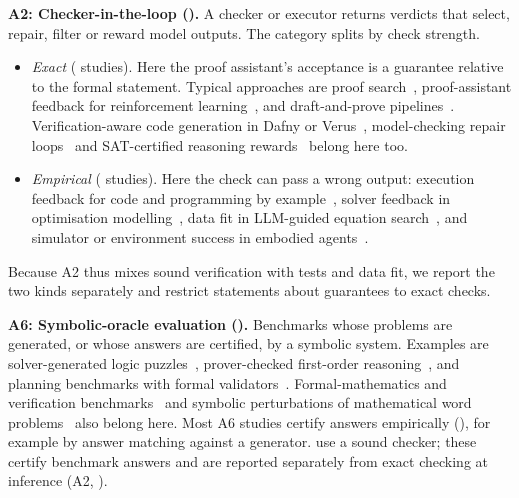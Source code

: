 \textbf{A2: Checker-in-the-loop ().} A checker or executor returns verdicts that select, repair, filter or reward model outputs. The category splits by check strength.
\begin{itemize}
  \item \emph{Exact} ( studies). Here the proof assistant's acceptance is a guarantee relative to the formal statement. Typical approaches are proof search~\cite{lample2022hypertree,jiang2022thor,yang2023leandojo,xin2025bfs}, proof-assistant feedback for reinforcement learning~\cite{xin2025deepseek,dong2025stp,lin2026goedel}, and draft-and-prove pipelines~\cite{jiang2023draft,cao2025reviving,varambally2026hilbert}. Verification-aware code generation in Dafny or Verus~\cite{aggarwal2025alphaverus,yang2026exverus}, model-checking repair loops~\cite{agrawal2025specmas} and SAT-certified reasoning rewards~\cite{liu2025saturn} belong here too.
  \item \emph{Empirical} ( studies). Here the check can pass a wrong output: execution feedback for code and programming by example~\cite{ni2023lever,wang2024hypothesis,lee2025program}, solver feedback in optimisation modelling~\cite{ahmaditeshnizi2024optimus,chen2025solver}, data fit in LLM-guided equation search~\cite{shojaee2025sr,grayeli2024symbolic}, and simulator or environment success in embodied agents~\cite{ma2024eureka,mahdavi2024leveraging}.
\end{itemize}
Because A2 thus mixes sound verification with tests and data fit, we report the two kinds separately and restrict statements about guarantees to exact checks.

\textbf{A6: Symbolic-oracle evaluation ().} Benchmarks whose problems are generated, or whose answers are certified, by a symbolic system. Examples are solver-generated logic puzzles~\cite{lin2025zebralogic,wei2025satbench}, prover-checked first-order reasoning~\cite{qi2025large,han2024folio}, and planning benchmarks with formal validators~\cite{zuo2025planetarium,kokel2025acpbench}. Formal-mathematics and verification benchmarks~\cite{zheng2022minif2f,tsoukalas2024putnambench,hu2025minictx,ye2026verina} and symbolic perturbations of mathematical word problems~\cite{mirzadeh2025gsm} also belong here. Most A6 studies certify answers empirically (), for example by answer matching against a generator.  use a sound checker; these certify benchmark answers and are reported separately from exact checking at inference (A2, ).

